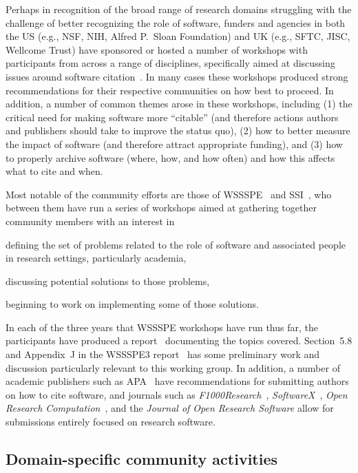 \documentclass[12pt, oneside]{amsart}
\begin{document}
Perhaps in recognition of the broad range of research domains struggling with
the challenge of better recognizing the role of software, funders and agencies
in both the US (e.g., NSF, NIH, Alfred P.\ Sloan Foundation) and UK (e.g.,
SFTC, JISC, Wellcome Trust) have sponsored or hosted a number of workshops with
participants from across a range of
disciplines, specifically aimed at discussing issues around software
citation~\cite{Sufi:2014en,Ahalt:2015ve,ssisoftwarecredit,aas-software-index,saga,Allen:2015ub}.
In many cases these workshops produced strong recommendations for their
respective communities on how best to proceed. In addition, a number of common
themes arose in these workshops, including (1) the critical need for making
software more ``citable'' (and therefore actions authors and publishers
should take to improve the status quo), (2) how to better measure the impact
of software (and therefore attract appropriate funding), and (3) how to
properly archive software (where, how, and how often) and how this affects
what to cite and when.


Most notable of the community efforts are those of WSSSPE~\cite{wssspe} and
SSI~\cite{ssi-workshops}, who between them have run a series of workshops aimed
at gathering together community members with an interest in~
\begin{enumerate*}[series=InlineList]
    \item defining the set
of problems related to the role of software and associated people in research
settings, particularly academia,
    \item discussing potential solutions to those
problems,
\item beginning to work on implementing some of those solutions.
  \end{enumerate*}
In each of the three years that WSSSPE workshops have run thus far, the
participants have produced a report~\cite{WSSSPE1,WSSSPE2,WSSSPE3} documenting
the topics covered. Section~5.8 and Appendix~J in the WSSSPE3
report~\cite{WSSSPE3} has some preliminary work and discussion particularly
relevant to this working group.  In addition, a number of academic publishers
such as APA~\cite{APA-guidelines} have recommendations for submitting authors on
how to cite software, and journals such as \emph{F1000Research}~\cite{F1000},
\emph{SoftwareX}~\cite{softwareX}, \emph{Open Research Computation}~\cite{ORC}, and
the \emph{Journal of Open Research Software} allow for submissions entirely
focused on research software.

\subsection{Domain-specific community activities}
\end{document}
